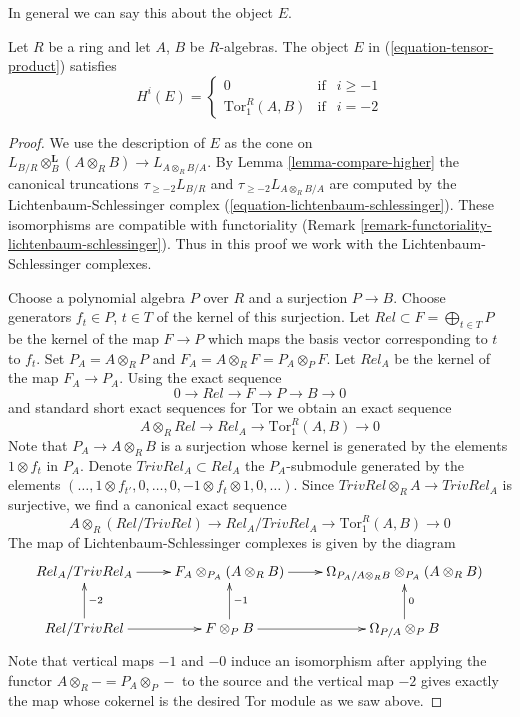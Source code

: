 \noindent
In general we can say this about the object $E$.

\begin{lemma}
\label{lemma-tensor-product}
Let $R$ be a ring and let $A$, $B$ be $R$-algebras. The object $E$
in (\ref{equation-tensor-product}) satisfies
$$
H^i(E) =
\left\{
\begin{matrix}
0 & \text{if} & i \geq -1 \\
\text{Tor}_1^R(A, B) & \text{if} & i = -2
\end{matrix}
\right.
$$
\end{lemma}

\begin{proof}
We use the description of $E$ as the cone on
$L_{B/R} \otimes_B^\mathbf{L} (A \otimes_R B) \to L_{A \otimes_R B/A}$.
By Lemma \ref{lemma-compare-higher} the canonical truncations
$\tau_{\geq -2}L_{B/R}$ and $\tau_{\geq -2}L_{A \otimes_R B/A}$
are computed by the Lichtenbaum-Schlessinger complex
(\ref{equation-lichtenbaum-schlessinger}).
These isomorphisms are compatible with functoriality
(Remark \ref{remark-functoriality-lichtenbaum-schlessinger}).
Thus in this proof we work with the Lichtenbaum-Schlessinger complexes.

\medskip\noindent
Choose a polynomial algebra $P$ over $R$ and a surjection $P \to B$.
Choose generators $f_t \in P$, $t \in T$ of the kernel of this surjection.
Let $Rel \subset F = \bigoplus_{t \in T} P$ be the kernel of the map
$F \to P$ which maps the basis vector corresponding to $t$ to $f_t$.
Set $P_A = A \otimes_R P$ and $F_A = A \otimes_R F = P_A \otimes_P F$.
Let $Rel_A$ be the kernel of the map $F_A \to P_A$. Using the exact sequence
$$
0 \to Rel \to F \to P \to B \to 0
$$
and standard short exact sequences for Tor we obtain an exact sequence
$$
A \otimes_R Rel \to Rel_A \to \text{Tor}_1^R(A, B) \to 0
$$
Note that $P_A \to A \otimes_R B$ is a surjection whose kernel is generated
by the elements $1 \otimes f_t$ in $P_A$. Denote $TrivRel_A \subset Rel_A$
the $P_A$-submodule generated by the elements
$(\ldots, 1 \otimes f_{t'}, 0, \ldots,
0, - 1 \otimes f_t \otimes 1, 0, \ldots)$.
Since $TrivRel \otimes_R A \to TrivRel_A$ is surjective, we find a
canonical exact sequence
$$
A \otimes_R (Rel/TrivRel) \to Rel_A/TrivRel_A \to \text{Tor}_1^R(A, B) \to 0
$$
The map of Lichtenbaum-Schlessinger complexes is given by the diagram
$$
\xymatrix{
Rel_A/TrivRel_A \ar[r] &
F_A \otimes_{P_A} (A \otimes_R B) \ar[r] &
\Omega_{P_A/A \otimes_R B} \otimes_{P_A} (A \otimes_R B) \\
Rel/TrivRel \ar[r] \ar[u]_{-2} &
F \otimes_P B \ar[r] \ar[u]_{-1} &
\Omega_{P/A} \otimes_P B \ar[u]_0
}
$$
Note that vertical maps $-1$ and $-0$ induce an isomorphism after applying
the functor $A \otimes_R - = P_A \otimes_P -$ to the source and the vertical
map $-2$ gives exactly the map whose cokernel is the desired Tor module
as we saw above.
\end{proof}












